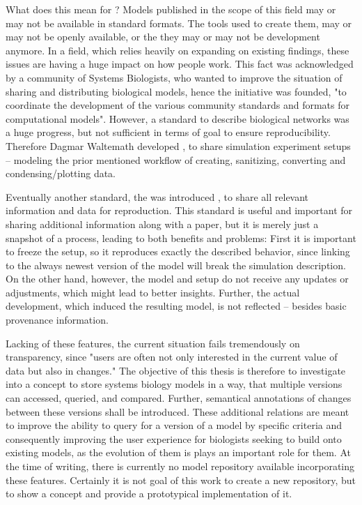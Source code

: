 What does this mean for \sysbio? Models published in the scope of this field may or may not be available in standard formats. The tools used to create them, may or may not be openly available, or the they may or may not be development anymore. \cite{Peng2011}
In a field, which relies heavily on expanding on existing findings, these issues are having a huge impact on how people work.
This fact was acknowledged by a community of Systems Biologists, who wanted to improve the situation of sharing and distributing biological models, hence the \combine initiative was founded, "to coordinate the development of the various community standards and formats for computational models". \cite{COMBINE}
However, a standard to describe biological networks was a huge progress, but not sufficient in terms of goal to ensure reproducibility. Therefore Dagmar Waltemath developed \sedml \cite{Waltemath2011a}, to share simulation experiment setups -- modeling the prior mentioned workflow of creating, sanitizing, converting and condensing/plotting data.

Eventually another standard, the \ca was introduced \cite{Bergmann2014a}, to share all relevant information and data for reproduction. This standard is useful and important for sharing additional information along with a paper, but it is merely just a snapshot of a process, leading to both benefits and problems: First it is important to freeze the setup, so it reproduces exactly the described behavior, since linking to the always newest version of the model will break the simulation description. On the other hand, however, the model and setup do not receive any updates or adjustments, which might lead to better insights. Further, the actual development, which induced the resulting model, is not reflected -- besides basic provenance information.

Lacking of these features, the current situation fails tremendously on transparency, since "users are often not only interested in the current value of data but also in changes." \cite{Cobena2002}
The objective of this thesis is therefore to investigate into a concept to store systems biology models in a way, that multiple versions can accessed, queried, and compared. Further, semantical annotations of changes between these versions shall be introduced. These additional relations are meant to improve the ability to query for a version of a model by specific criteria and consequently improving the user experience for biologists seeking to build onto existing models, as the evolution of them is plays an important role for them. \cite{Scharm2015}
At the time of writing, there is currently no model repository available incorporating these features. Certainly it is not goal of this work to create a new repository, but to show a concept and provide a prototypical implementation of it.

